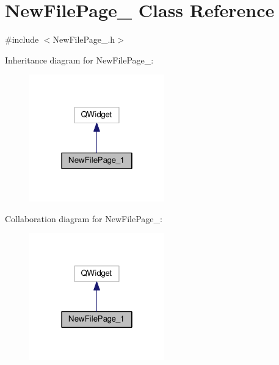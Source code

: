 \hypertarget{class_new_file_page__1}{\section{New\-File\-Page\-\_ Class Reference}
\label{class_new_file_page__1}
}


{\ttfamily \#include $<$New\-File\-Page\-\_.\-h$>$}



Inheritance diagram for New\-File\-Page\-\_\-:\nopagebreak
\begin{figure}[H]
\begin{center}
\leavevmode
\includegraphics[width=166pt]{class_new_file_page__1__inherit__graph}
\end{center}
\end{figure}


Collaboration diagram for New\-File\-Page\-\_\-:\nopagebreak
\begin{figure}[H]
\begin{center}
\leavevmode
\includegraphics[width=166pt]{class_new_file_page__1__coll__graph}
\end{center}
\end{figure}
